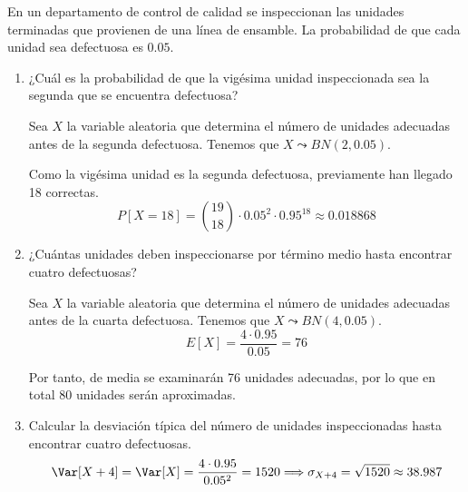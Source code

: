 \begin{ejercicio}
    En un departamento de control de calidad se inspeccionan las unidades terminadas que provienen de una línea de ensamble. La probabilidad de que cada unidad sea defectuosa es $0.05$.
    \begin{enumerate}
        \item  ¿Cuál es la probabilidad de que la vigésima unidad inspeccionada sea la segunda que se encuentra defectuosa?

        Sea $X$ la variable aleatoria que determina el número de unidades adecuadas antes de la segunda defectuosa. Tenemos que $X\leadsto BN(2, 0.05)$.

        Como la vigésima unidad es la segunda defectuosa, previamente han llegado 18 correctas.
        \begin{equation*}
            P[X=18]=\binom{19}{18}\cdot 0.05^2 \cdot 0.95^{18} \approx 0.018868
        \end{equation*}
        
        \item  ¿Cuántas unidades deben inspeccionarse por término medio hasta encontrar cuatro defectuosas?

        Sea $X$ la variable aleatoria que determina el número de unidades adecuadas antes de la cuarta defectuosa. Tenemos que $X\leadsto BN(4, 0.05)$.
        \begin{equation*}
            E[X]=\frac{4\cdot 0.95}{0.05}=76
        \end{equation*}

        Por tanto, de media se examinarán 76 unidades adecuadas, por lo que en total 80 unidades serán aproximadas.
        
        \item  Calcular la desviación típica del número de unidades inspeccionadas hasta encontrar cuatro defectuosas.
        \begin{equation*}
            \Var[X+4]=\Var[X]=\frac{4\cdot 0.95}{0.05^2}=1520 \Longrightarrow \sigma_{X+4}=\sqrt{1520}\approx 38.987
        \end{equation*}
    \end{enumerate}
\end{ejercicio}


